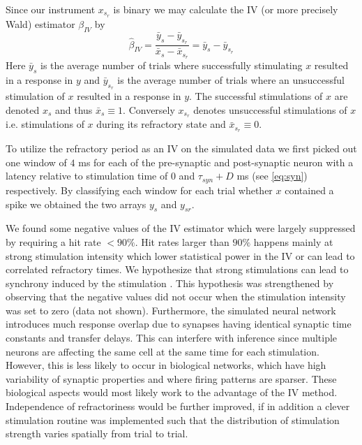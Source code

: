 \documentclass[11pt]{article}
\begin{document}
Since our instrument $ x_{s_r} $ is binary we may calculate the IV (or more precisely Wald) estimator \citep{wald1940fitting} $ \beta_{IV} $ by
\begin{equation}
 \hat{\beta}_{IV} = \frac{\bar{y}_{s} - \bar{y}_{s_r}}{\bar{x}_{s} - \bar{x}_{s_r}} = \bar{y}_{s} - \bar{y}_{s_r}
 \label{eq:wald}
\end{equation}
Here $ \bar{y}_s $ is the average number of trials where successfully stimulating $ x $ resulted in a response in $ y $ and $ \bar{y}_{s_r} $ is the average number of trials where an unsuccessful stimulation of $x$ resulted in a response in $ y $. 
The successful stimulations of $x$ are denoted $x_s$ and thus $\bar{x}_s \equiv 1$. 
Conversely $x_{s_r}$ denotes unsuccessful stimulations of $x$ i.e. stimulations of $x$ during its refractory state and $\bar{x}_{s_r} \equiv 0$.

To utilize the refractory period as an IV on the simulated data we first picked out one window of $ 4 $ ms for each of the pre-synaptic and post-synaptic neuron with a latency relative to stimulation time of $ 0 $ and $ \tau_{syn} + D $ ms (see \cref{eq:syn}) respectively. 
By classifying each window for each trial whether $x$ contained a spike we obtained the two arrays $ y_s $ and $ y_{sr} $.

We found some negative values of the IV estimator which were largely suppressed by requiring a hit rate $ < 90\%$. 
Hit rates larger than $90\%$ happens mainly at strong stimulation intensity which lower statistical power in the IV or can lead to correlated refractory times. 
We hypothesize that strong stimulations can lead to synchrony induced by the stimulation \citep{ermentrout2008reliability}. 
This hypothesis was strengthened by observing that the negative values did not occur when the stimulation intensity was set to zero (data not shown). 
Furthermore, the simulated neural network introduces much response overlap due to synapses having identical synaptic time constants and transfer delays. 
This can interfere with inference since multiple neurons are affecting the same cell at the same time for each stimulation. 
However, this is less likely to occur in biological networks, which have high variability of synaptic properties and where firing patterns are sparser. 
These biological aspects would most likely work to the advantage of the IV method. 
Independence of refractoriness would be further improved, if in addition a clever stimulation routine was implemented such that the distribution of stimulation strength varies spatially from trial to trial.
\end{document}
